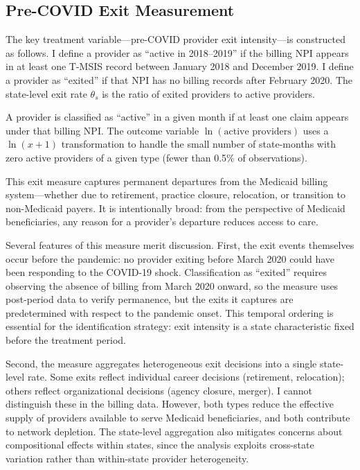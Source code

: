 \documentclass[12pt]{article}
\begin{document}
\subsection{Pre-COVID Exit Measurement}

The key treatment variable---pre-COVID provider exit intensity---is constructed as follows. I define a provider as ``active in 2018--2019'' if the billing NPI appears in at least one T-MSIS record between January 2018 and December 2019. I define a provider as ``exited'' if that NPI has no billing records after February 2020. The state-level exit rate $\theta_s$ is the ratio of exited providers to active providers.

A provider is classified as ``active'' in a given month if at least one claim appears under that billing NPI. The outcome variable $\ln(\text{active providers})$ uses a $\ln(x+1)$ transformation to handle the small number of state-months with zero active providers of a given type (fewer than 0.5\% of observations).

This exit measure captures permanent departures from the Medicaid billing system---whether due to retirement, practice closure, relocation, or transition to non-Medicaid payers. It is intentionally broad: from the perspective of Medicaid beneficiaries, any reason for a provider's departure reduces access to care.

Several features of this measure merit discussion. First, the exit events themselves occur before the pandemic: no provider exiting before March 2020 could have been responding to the COVID-19 shock. Classification as ``exited'' requires observing the absence of billing from March 2020 onward, so the measure uses post-period data to verify permanence, but the exits it captures are predetermined with respect to the pandemic onset. This temporal ordering is essential for the identification strategy: exit intensity is a state characteristic fixed before the treatment period.

Second, the measure aggregates heterogeneous exit decisions into a single state-level rate. Some exits reflect individual career decisions (retirement, relocation); others reflect organizational decisions (agency closure, merger). I cannot distinguish these in the billing data. However, both types reduce the effective supply of providers available to serve Medicaid beneficiaries, and both contribute to network depletion. The state-level aggregation also mitigates concerns about compositional effects within states, since the analysis exploits cross-state variation rather than within-state provider heterogeneity.
\end{document}
